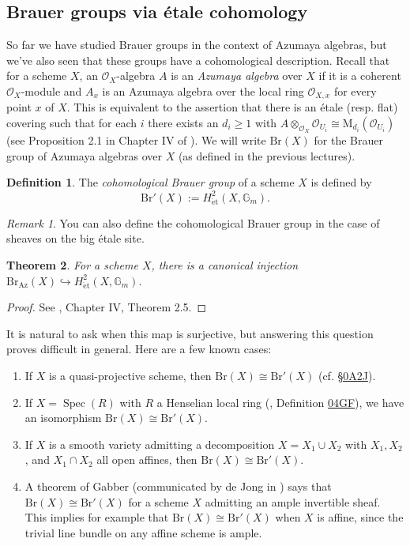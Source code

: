 \documentclass{article}
\def\~#1{\mathscr{#1}}
\numberwithin{equation}{section}
\numberwithin{figure}{section}
\newcommand{\G}{\mathbb{G}}
\newcommand{\M}{\mathrm{M}}
\newcommand{\Br}{\mathrm{Br}}
\newcommand{\Az}{\mathrm{Az}}
\newcommand{\mono}{\hookrightarrow}
\newcommand{\Spec}{\mathop{\mathrm{Spec}}}
\newcommand{\et}{\acute{\mathrm{e}}\mathrm{t}}
\theoremstyle{plain}
\newtheorem{thm}{Theorem}[section]
\theoremstyle{definition}
\newtheorem{defn}[thm]{Definition}
\theoremstyle{remark}
\newtheorem*{rmk}{Remark}
\begin{document}
\subsection{Brauer groups via \'etale cohomology}

So far we have studied Brauer groups in the context of Azumaya algebras, but we've also seen that these groups have a cohomological description. Recall that for a scheme $X$, an $\~O_X$-algebra $A$ is an \emph{Azumaya algebra} over $X$ if it is a coherent $\~O_X$-module and $A_x$ is an Azumaya algebra over the local ring $\~O_{X, x}$ for every point $x$ of $X$. This is equivalent to the assertion that there is an \'etale (resp. flat) covering such that for each $i$ there exists an $d_i \ge 1$ with $A \otimes_{\~O_X} \~O_{U_i} \cong \M_{d_i}(\~O_{U_i})$ (see Proposition 2.1 in Chapter IV of \cite{milne_etalebook}). We will write $\Br(X)$ for the Brauer group of Azumaya algebras over $X$ (as defined in the previous lectures).

\begin{defn}
    The \emph{cohomological Brauer group} of a scheme $X$ is defined by
    \[\Br'(X) := H_{\et}^2(X, \G_m).\]
\end{defn}

\begin{rmk}
    You can also define the cohomological Brauer group in the case of sheaves on the big \'etale site.
\end{rmk}

\begin{thm}
    For a scheme $X$, there is a canonical injection $\Br_{\Az}(X) \mono H^2_{\et}(X, \G_m)$.
\end{thm}
\begin{proof}
    See \cite{milne_etalebook}, Chapter IV, Theorem 2.5.
\end{proof} 

It is natural to ask when this map is surjective, but answering this question proves difficult in general. Here are a few known cases:
\begin{enumerate}
    \item If $X$ is a quasi-projective scheme, then $\Br(X) \cong \Br'(X)$ (cf. \cite{stacks} \href{https://stacks.math.columbia.edu/tag/0A2J}{\S0A2J}).
    \item If $X = \Spec(R)$ with $R$ a Henselian local ring (\cite{stacks}, Definition \href{https://stacks.math.columbia.edu/tag/04GF}{04GF}), we have an isomorphism $\Br(X) \cong \Br'(X)$.
    \item If $X$ is a smooth variety admitting a decomposition $X = X_1 \cup X_2$ with $X_1, X_2$, and $X_1 \cap X_2$ all open affines, then $\Br(X) \cong \Br'(X)$.
    \item A theorem of Gabber (communicated by de Jong in \cite{deJong_Gabber}) says that $\Br(X) \cong \Br'(X)$ for a scheme $X$ admitting an ample invertible sheaf. This implies for example that $\Br(X) \cong \Br'(X)$ when $X$ is affine, since the trivial line bundle on any affine scheme is ample.
\end{enumerate}
\end{document}
